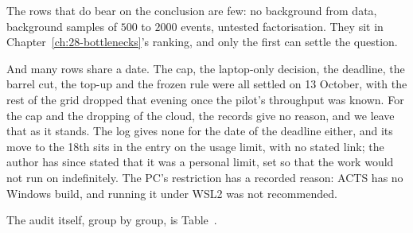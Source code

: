 The rows that do bear on the conclusion are few: no background from data, background samples of $500$ to $2000$ events, untested factorisation. They sit in Chapter~\ref{ch:28-bottlenecks}'s ranking, and only the first can settle the question.

And many rows share a date. The cap, the laptop-only decision, the deadline, the barrel cut, the top-up and the frozen rule were all settled on 13 October, with the rest of the grid dropped that evening once the pilot's throughput was known. For the cap and the dropping of the cloud, the records give no reason, and we leave that as it stands. The log gives none for the date of the deadline either, and its move to the 18th sits in the entry on the usage limit, with no stated link; the author has since stated that it was a personal limit, set so that the work would not run on indefinitely. The PC's restriction has a recorded reason: ACTS has no Windows build, and running it under WSL2 was not recommended.

\noindent{}\label{tab:29-audit}%
The audit itself, group by group, is Table~\thetable.

